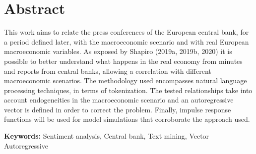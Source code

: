
\chapter*{Abstract}
This work aims to relate the press conferences of the European central bank, for a period defined later, with the macroeconomic scenario and with real European macroeconomic variables. As exposed by Shapiro (2019a, 2019b, 2020) it is possible to better understand what happens in the real economy from minutes and reports from central banks, allowing a correlation with different macroeconomic scenarios. The methodology used encompasses natural language processing techniques, in terms of tokenization. The tested relationships take into account endogeneities in the macroeconomic scenario and an autoregressive vector is defined in order to correct the problem. Finally, impulse response functions will be used for model simulations that corroborate the approach used.

\par
\vspace{0.5in}    
    
\noindent
{\bf Keywords:} Sentiment analysis, Central bank, Text mining, Vector Autoregressive



  